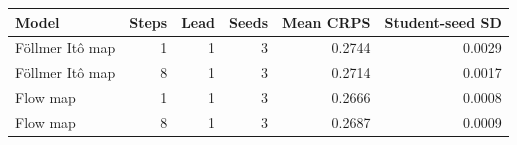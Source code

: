 \begin{tabular}{lrrrrr}
\toprule
Model & Steps & Lead & Seeds & Mean CRPS & Student-seed SD \\
\midrule
Föllmer Itô map & 1 & 1 & 3 & 0.2744 & 0.0029 \\
Föllmer Itô map & 8 & 1 & 3 & 0.2714 & 0.0017 \\
Flow map & 1 & 1 & 3 & 0.2666 & 0.0008 \\
Flow map & 8 & 1 & 3 & 0.2687 & 0.0009 \\
\bottomrule
\end{tabular}

